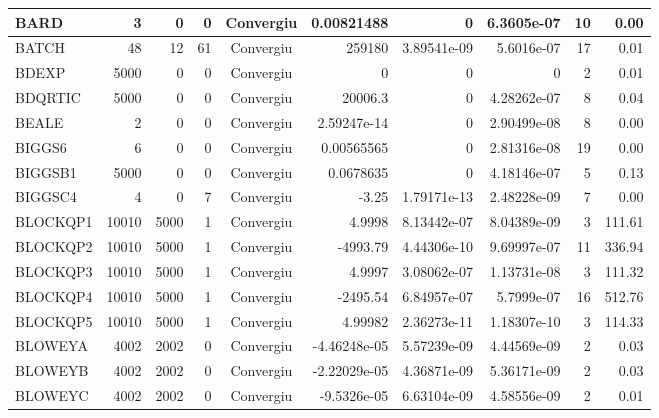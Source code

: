 \begin{center}
\begin{longtable}{|l|r|r|r|c|r|r|r|r|r|}
    BARD &      3 &      0 &      0 & Convergiu  &  0.00821488 &              0 &  6.3605e-07 &     10 &    0.00 \\ \hline
   BATCH &     48 &     12 &     61 & Convergiu  &      259180 &    3.89541e-09 &  5.6016e-07 &     17 &    0.01 \\ \hline
   BDEXP &   5000 &      0 &      0 & Convergiu  &           0 &              0 &           0 &      2 &    0.01 \\ \hline
 BDQRTIC &   5000 &      0 &      0 & Convergiu  &     20006.3 &              0 & 4.28262e-07 &      8 &    0.04 \\ \hline
   BEALE &      2 &      0 &      0 & Convergiu  & 2.59247e-14 &              0 & 2.90499e-08 &      8 &    0.00 \\ \hline
  BIGGS6 &      6 &      0 &      0 & Convergiu  &  0.00565565 &              0 & 2.81316e-08 &     19 &    0.00 \\ \hline
 BIGGSB1 &   5000 &      0 &      0 & Convergiu  &   0.0678635 &              0 & 4.18146e-07 &      5 &    0.13 \\ \hline
 BIGGSC4 &      4 &      0 &      7 & Convergiu  &       -3.25 &    1.79171e-13 & 2.48228e-09 &      7 &    0.00 \\ \hline
BLOCKQP1 &  10010 &   5000 &      1 & Convergiu  &      4.9998 &    8.13442e-07 & 8.04389e-09 &      3 &  111.61 \\ \hline
BLOCKQP2 &  10010 &   5000 &      1 & Convergiu  &    -4993.79 &    4.44306e-10 & 9.69997e-07 &     11 &  336.94 \\ \hline
BLOCKQP3 &  10010 &   5000 &      1 & Convergiu  &      4.9997 &    3.08062e-07 & 1.13731e-08 &      3 &  111.32 \\ \hline
BLOCKQP4 &  10010 &   5000 &      1 & Convergiu  &    -2495.54 &    6.84957e-07 &  5.7999e-07 &     16 &  512.76 \\ \hline
BLOCKQP5 &  10010 &   5000 &      1 & Convergiu  &     4.99982 &    2.36273e-11 & 1.18307e-10 &      3 &  114.33 \\ \hline
 BLOWEYA &   4002 &   2002 &      0 & Convergiu  & -4.46248e-05 &    5.57239e-09 & 4.44569e-09 &      2 &    0.03 \\ \hline
 BLOWEYB &   4002 &   2002 &      0 & Convergiu  & -2.22029e-05 &    4.36871e-09 & 5.36171e-09 &      2 &    0.03 \\ \hline
 BLOWEYC &   4002 &   2002 &      0 & Convergiu  & -9.5326e-05 &    6.63104e-09 & 4.58556e-09 &      2 &    0.01 \\ \hline

\end{longtable}
\end{center}
